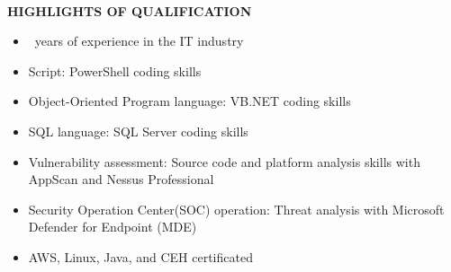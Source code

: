 \begin{center}
    \hrulefill \\
    \begin{large}
        \textbf{HIGHLIGHTS OF QUALIFICATION}
    \end{large}
\end{center}

\begin{itemize}
    \item \FPround{}\workExperience\ years of experience in the IT industry
    \item Script: PowerShell coding skills
    \item Object-Oriented Program language: VB.NET coding skills
    \item SQL language: SQL Server coding skills
    \item Vulnerability assessment: Source code and platform analysis skills with AppScan and Nessus Professional
    \item Security Operation Center(SOC) operation: Threat analysis with Microsoft Defender for Endpoint (MDE)
    \item AWS, Linux, Java, and CEH certificated
\end{itemize}
